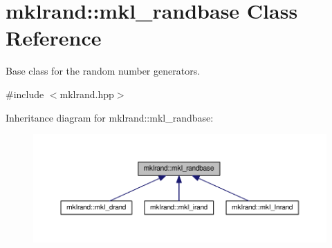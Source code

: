 \hypertarget{classmklrand_1_1mkl__randbase}{}\section{mklrand\+:\+:mkl\+\_\+randbase Class Reference}
\label{classmklrand_1_1mkl__randbase}


Base class for the random number generators.  




{\ttfamily \#include $<$mklrand.\+hpp$>$}



Inheritance diagram for mklrand\+:\+:mkl\+\_\+randbase\+:\nopagebreak
\begin{figure}[H]
\begin{center}
\leavevmode
\includegraphics[width=350pt]{db/d0e/classmklrand_1_1mkl__randbase__inherit__graph}
\end{center}
\end{figure}
